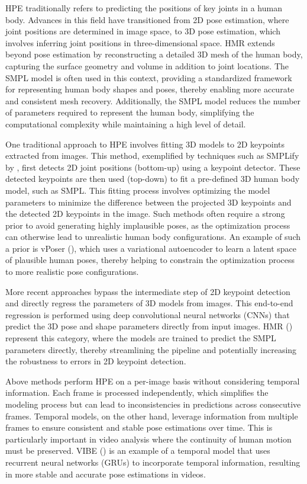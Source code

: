 HPE traditionally refers to predicting the positions of key joints in a human body. Advances in this field have transitioned from 2D pose estimation, where joint positions are determined in image space, to 3D pose estimation, which involves inferring joint positions in three-dimensional space. HMR extends beyond pose estimation by reconstructing a detailed 3D mesh of the human body, capturing the surface geometry and volume in addition to joint locations. The SMPL model is often used in this context, providing a standardized framework for representing human body shapes and poses, thereby enabling more accurate and consistent mesh recovery. Additionally, the SMPL model reduces the number of parameters required to represent the human body, simplifying the computational complexity while maintaining a high level of detail.

One traditional approach to HPE involves fitting 3D models to 2D keypoints extracted from images. This method, exemplified by techniques such as SMPLify by \cite{BogoSMPLify2016}, first detects 2D joint positions (bottom-up) using a keypoint detector. These detected keypoints are then used (top-down) to fit a pre-defined 3D human body model, such as SMPL. This fitting process involves optimizing the model parameters to minimize the difference between the projected 3D keypoints and the detected 2D keypoints in the image. Such methods often require a strong prior to avoid generating highly implausible poses, as the optimization process can otherwise lead to unrealistic human body configurations. An example of such a prior is vPoser (\cite{SMPL-X:2019}), which uses a variational autoencoder to learn a latent space of plausible human poses, thereby helping to constrain the optimization process to more realistic pose configurations.

More recent approaches bypass the intermediate step of 2D keypoint detection and directly regress the parameters of 3D models from images. This end-to-end regression is performed using deep convolutional neural networks (CNNs) that predict the 3D pose and shape parameters directly from input images. HMR (\cite{hmrKanazawa17}) represent this category, where the models are trained to predict the SMPL parameters directly, thereby streamlining the pipeline and potentially increasing the robustness to errors in 2D keypoint detection.

Above methods perform HPE on a per-image basis without considering temporal information. Each frame is processed independently, which simplifies the modeling process but can lead to inconsistencies in predictions across consecutive frames.
Temporal models, on the other hand, leverage information from multiple frames to ensure consistent and stable pose estimations over time. This is particularly important in video analysis where the continuity of human motion must be preserved. VIBE (\cite{kocabas2019vibe}) is an example of a temporal model that uses recurrent neural networks (GRUs) to incorporate temporal information, resulting in more stable and accurate pose estimations in videos.

